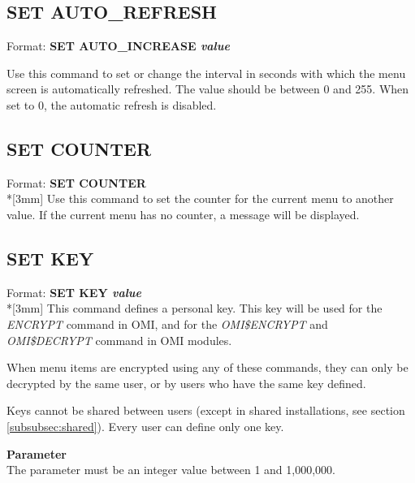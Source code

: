 \documentclass[a4paper]{book}
\newcommand{\vs}{\vspace{3mm}}
\renewcommand{\indent}{\hspace*{5mm}}
\begin{document}
\subsection{SET AUTO{\_}REFRESH}
\label{subsubsec:mylabel74}

\indent Format: \textbf{SET AUTO{\_}INCREASE \textit{value}}

\noindent Use this command to set or change the interval in seconds with which the 
menu screen is automatically refreshed. The value should be between 0 and 
255. When set to 0, the automatic refresh is disabled.

\subsection{SET COUNTER}
\label{subsubsec:mylabel75}

\indent Format: \textbf{SET COUNTER}\\*[3mm]
Use this command to set the counter for the current menu to another value. 
If the current menu has no counter, a message will be displayed.

\subsection{SET KEY}
\label{subsubsec:mylabel76}

\indent Format: \textbf{SET KEY \textit{value}}\\*[3mm]
This command defines a personal key. This key will be used for the 
\textsl{ENCRYPT} command in OMI, and for the 
\textsl{OMI{\$}ENCRYPT} and 
\textsl{OMI{\$}DECRYPT} command in OMI 
modules.

\vs

When menu items are encrypted using any of these commands, they can only be 
decrypted by the same user, or by users who have the same key defined.

Keys cannot be shared between users (except in shared installations, see 
section \ref{subsubsec:shared}). Every user can define only one key.

\noindent\textbf{Parameter}\\[3mm]
The parameter must be an integer value between 1 and 1,000,000.
\end{document}
